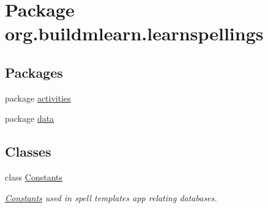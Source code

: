 \hypertarget{namespaceorg_1_1buildmlearn_1_1learnspellings}{}\section{Package org.\+buildmlearn.\+learnspellings}
\label{namespaceorg_1_1buildmlearn_1_1learnspellings}
\subsection*{Packages}
\begin{DoxyCompactItemize}
\item 
package \hyperlink{namespaceorg_1_1buildmlearn_1_1learnspellings_1_1activities}{activities}
\item 
package \hyperlink{namespaceorg_1_1buildmlearn_1_1learnspellings_1_1data}{data}
\end{DoxyCompactItemize}
\subsection*{Classes}
\begin{DoxyCompactItemize}
\item 
class \hyperlink{classorg_1_1buildmlearn_1_1learnspellings_1_1Constants}{Constants}
\begin{DoxyCompactList}\small\item\em \hyperlink{classorg_1_1buildmlearn_1_1learnspellings_1_1Constants}{Constants} used in spell template\textquotesingle{}s app relating databases. \end{DoxyCompactList}\end{DoxyCompactItemize}
